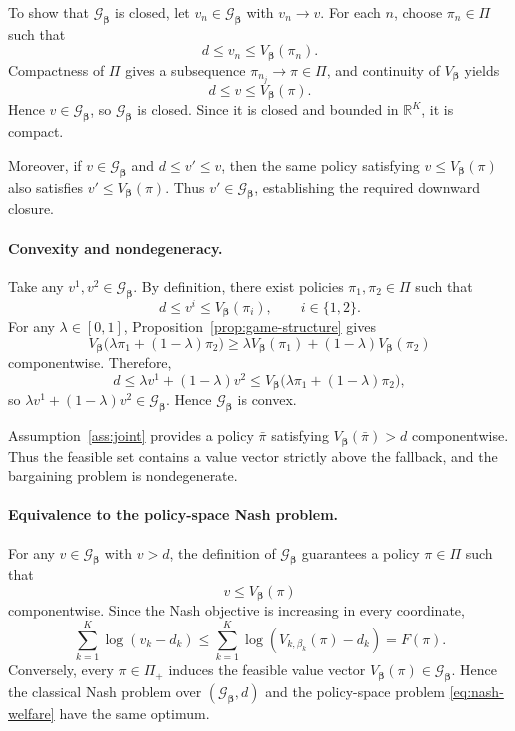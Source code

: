 \documentclass{article}
\theoremstyle{remark}
\theoremstyle{plain}
\newcommand{\G}{\mathcal{G}}
\newcommand{\R}{\mathbb{R}}
\begin{document}
To show that $\G_{\boldsymbol\beta}$ is closed, let
$v_n\in\G_{\boldsymbol\beta}$ with $v_n\to v$. For each $n$, choose
$\pi_n\in\Pi$ such that
\[
d\le v_n\le V_{\boldsymbol\beta}(\pi_n).
\]
Compactness of $\Pi$ gives a subsequence
$\pi_{n_j}\to\pi\in\Pi$, and continuity of
$V_{\boldsymbol\beta}$ yields
\[
d\le v\le V_{\boldsymbol\beta}(\pi).
\]
Hence $v\in\G_{\boldsymbol\beta}$, so
$\G_{\boldsymbol\beta}$ is closed. Since it is closed and bounded in
$\R^K$, it is compact.

Moreover, if $v\in\G_{\boldsymbol\beta}$ and
$d\le v'\le v$, then the same policy satisfying
$v\le V_{\boldsymbol\beta}(\pi)$ also satisfies
$v'\le V_{\boldsymbol\beta}(\pi)$. Thus
$v'\in\G_{\boldsymbol\beta}$, establishing the required downward
closure.

\paragraph{Convexity and nondegeneracy.}
Take any $v^1,v^2\in\G_{\boldsymbol\beta}$. By definition, there exist
policies $\pi_1,\pi_2\in\Pi$ such that
\[
d\le v^i\le V_{\boldsymbol\beta}(\pi_i),
\qquad i\in\{1,2\}.
\]
For any $\lambda\in[0,1]$, Proposition~\ref{prop:game-structure}
gives
\[
V_{\boldsymbol\beta}
\bigl(\lambda\pi_1+(1-\lambda)\pi_2\bigr)
\ge
\lambda V_{\boldsymbol\beta}(\pi_1)
+
(1-\lambda)V_{\boldsymbol\beta}(\pi_2)
\]
componentwise. Therefore,
\[
d
\le
\lambda v^1+(1-\lambda)v^2
\le
V_{\boldsymbol\beta}
\bigl(\lambda\pi_1+(1-\lambda)\pi_2\bigr),
\]
so
$\lambda v^1+(1-\lambda)v^2\in\G_{\boldsymbol\beta}$.
Hence $\G_{\boldsymbol\beta}$ is convex.

Assumption~\ref{ass:joint} provides a policy $\bar\pi$ satisfying
$V_{\boldsymbol\beta}(\bar\pi)>d$ componentwise. Thus the feasible set
contains a value vector strictly above the fallback, and the bargaining
problem is nondegenerate.

\paragraph{Equivalence to the policy-space Nash problem.}
For any $v\in\G_{\boldsymbol\beta}$ with $v>d$, the definition of
$\G_{\boldsymbol\beta}$ guarantees a policy $\pi\in\Pi$ such that
\[
v\le V_{\boldsymbol\beta}(\pi)
\]
componentwise. Since the Nash objective is increasing in every
coordinate,
\[
\sum_{k=1}^K\log(v_k-d_k)
\le
\sum_{k=1}^K
\log\!\left(V_{k,\beta_k}(\pi)-d_k\right)
=
F(\pi).
\]
Conversely, every $\pi\in\Pi_+$ induces the feasible value vector
$V_{\boldsymbol\beta}(\pi)\in\G_{\boldsymbol\beta}$.
Hence the classical Nash problem over
$(\G_{\boldsymbol\beta},d)$ and the policy-space problem
\eqref{eq:nash-welfare} have the same optimum.
\end{document}
